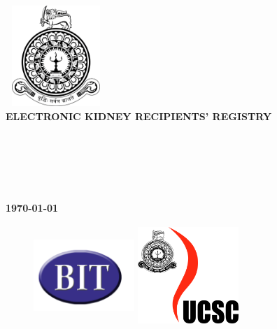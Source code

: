 \documentclass[12pt,a4paper]{report}
\begin{document}
\begin{titlepage}


\center %
{
\includegraphics[width=1.5in,height=1.5in,keepaspectratio]{logo.png}\\[0.5cm]
\fontsize{20pt}{30}\selectfont \textbf{\uppercase{ELECTRONIC KIDNEY RECIPIENTS' REGISTRY}}\\[1.5cm]
\fontsize{16pt}{24}\selectfont{B GNANAKEETHAN} \\
\fontsize{16pt}{24}\selectfont{R1812154} \\
\fontsize{16pt}{24}\selectfont{18121548} \\[1cm]

\fontsize{16pt}{24}\selectfont{Name of the Supervisor:} \\[0.5cm]
\fontsize{16pt}{24}\selectfont{Ms. B. Yaalini} \\[0.5cm]


\vspace*{\fill}

\fontsize{16pt}{24}\selectfont\textbf{\monthyeardate\today} \\[0.5cm]


\vspace*{\fill}


\begin{figure}[!h]
  \centering
  \begin{minipage}[b]{0.2\textwidth}
    \includegraphics[width=1.5in,height=1.5in,keepaspectratio]{bit-logo.png}
  \end{minipage}
  \hfill
  \begin{minipage}[b]{0.2\textwidth}
    \includegraphics[width=1.5in,height=1.5in,keepaspectratio]{ucsc-logo.jpg}
  \end{minipage}
\end{figure}

}
\end{titlepage}
\end{document}
